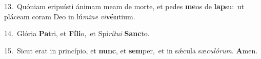 {\numbfont\textcolor{\numbcolor}{13.}}~Quóniam eripuísti ánimam meam de morte, et pedes \textbf{me}\-os de \textbf{lap}\-su:~\star ut pláceam coram Deo in lú\-\textit{mi}\-\textit{ne} \textit{vi}\-\textbf{vén}tium.\par
{\numbfont\textcolor{\numbcolor}{14.}}~Glória \textbf{Pa}\-tri, et \textbf{Fí}\-\textbf{li}o,~\star et Spi\-\textit{rí}\-\textit{tu}\textit{i} \textbf{Sanc}\-to.\par
{\numbfont\textcolor{\numbcolor}{15.}}~Sicut erat in princípio, et \textbf{nunc}\-, et \textbf{sem}\-per,~\star et in sǽcula sæ\-\textit{cu}\-\textit{ló}\textit{rum}. \textbf{A}\-men.\par
